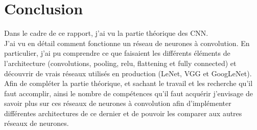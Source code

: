 \section{Conclusion}

Dans le cadre de ce rapport, j'ai vu la partie théorique des CNN.\\
J'ai vu en détail comment fonctionne un réseau de neurones à convolution. En particulier, j'ai pu comprendre ce que faisaient les différents éléments de l’architecture (convolutions, pooling, relu, flattening et fully connected) et découvrir de vrais réseaux utilisés en production (LeNet, VGG et GoogLeNet).\\[1cm]
Afin de compléter la partie théorique, et sachant le travail et les recherche qu'il faut accomplir, ainsi le nombre de compétences qu'il faut acquérir j’envisage de savoir plus sur ces réseaux de neurones à convolution afin d’implémenter différentes architectures de ce dernier et de pouvoir les comparer aux autres réseaux de neurones.